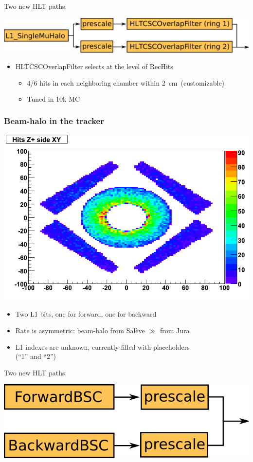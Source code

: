 \documentclass[compress]{beamer}
\begin{document}
\begin{frame}
\vfill
Two new HLT paths:
\begin{center}
\includegraphics[height=1.3 cm]{path_beamhalo_overlap.png}
\end{center}

\vfill
\begin{itemize}
\item HLTCSCOverlapFilter selects at the level of RecHits
\begin{itemize}
\item 4/6 hits in each neighboring chamber within \mbox{2~cm (customizable)\hspace{-1 cm}}
\item Tuned in 10k MC
\end{itemize}
\end{itemize}
\end{frame}

\begin{frame}
\frametitle{Beam-halo in the tracker}

\begin{center}
\includegraphics[width=0.6\linewidth]{XYpHalo.png}
\end{center}

\vspace{-0.5 cm}
\begin{itemize}
\item Two L1 bits, one for forward, one for backward
\item Rate is asymmetric: beam-halo from Sal\`eve $\gg$ from Jura
\item L1 indexes are unknown, currently filled with placeholders \\ \hfill (``1'' and ``2'')
\end{itemize}

\vspace{-0.3 cm}
Two new HLT paths:
\begin{center}
\includegraphics[height=1.3 cm]{path_tracker_beamhalo.png}
\end{center}

\end{frame}
\end{document}

